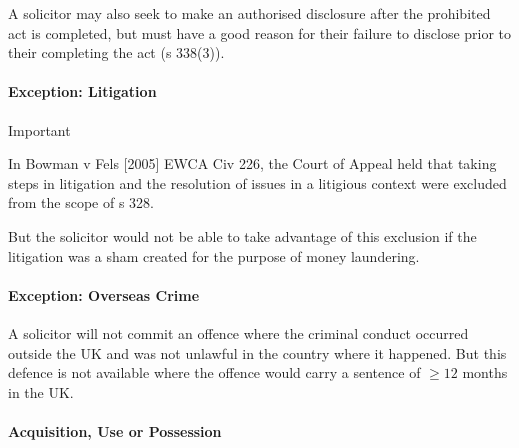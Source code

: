 \documentclass[
]{article}
\newenvironment{env-14852eae-23f3-42aa-ab4a-d94f5d4651db}
{
    \savenotes\tcolorbox[blanker,breakable,left=5pt,borderline west={2pt}{-4pt}{cyan}]
}
{
    \endtcolorbox\spewnotes
}
\begin{document}
A solicitor may also seek to make an authorised disclosure after the
prohibited act is completed, but must have a good reason for their
failure to disclose prior to their completing the act (s 338(3)).

\hypertarget{exception-litigation}{%
\paragraph{Exception: Litigation}\label{exception-litigation}}

\begin{env-14852eae-23f3-42aa-ab4a-d94f5d4651db}

Important

In Bowman v Fels {[}2005{]} EWCA Civ 226, the Court of Appeal held that
taking steps in litigation and the resolution of issues in a litigious
context were excluded from the scope of s 328.

\end{env-14852eae-23f3-42aa-ab4a-d94f5d4651db}

But the solicitor would not be able to take advantage of this exclusion
if the litigation was a sham created for the purpose of money
laundering.

\hypertarget{exception-overseas-crime}{%
\paragraph{Exception: Overseas Crime}\label{exception-overseas-crime}}

A solicitor will not commit an offence where the criminal conduct
occurred outside the UK and was not unlawful in the country where it
happened. But this defence is not available where the offence would
carry a sentence of {\(\geq 12\)} months in the UK.

\hypertarget{acquisition-use-or-possession}{%
\paragraph{Acquisition, Use or
Possession}\label{acquisition-use-or-possession}}
\end{document}
